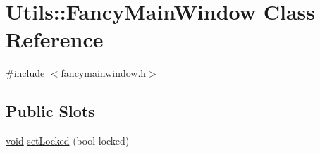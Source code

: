 \hypertarget{class_utils_1_1_fancy_main_window}{\section{\-Utils\-:\-:\-Fancy\-Main\-Window \-Class \-Reference}
\label{class_utils_1_1_fancy_main_window}
}


{\ttfamily \#include $<$fancymainwindow.\-h$>$}

\subsection*{\-Public \-Slots}
\begin{DoxyCompactItemize}
\item 
\hyperlink{group___u_a_v_objects_plugin_ga444cf2ff3f0ecbe028adce838d373f5c}{void} \hyperlink{class_utils_1_1_fancy_main_window_a4158149be21439e3eddf430c7dab6bb1}{set\-Locked} (bool locked)
\end{DoxyCompactItemize}
